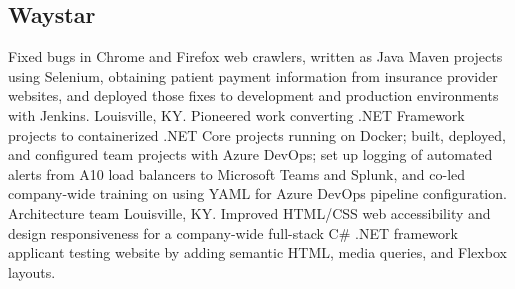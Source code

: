 \subsection{Waystar}
{Fixed bugs in Chrome and Firefox web crawlers, written as Java Maven projects using Selenium, obtaining patient payment information from insurance provider websites, and deployed those fixes to development and production environments with Jenkins.
}
{Louisville, KY. Pioneered work converting .NET Framework projects to containerized .NET Core projects running on Docker; built, deployed, and configured team projects with Azure DevOps; set up logging of automated alerts from A10 load balancers to Microsoft Teams and Splunk, and co-led company-wide training on using YAML for Azure DevOps pipeline configuration.
}
{Architecture team}
{}
{Louisville, KY. Improved HTML/CSS web accessibility and design responsiveness for a company-wide full-stack C\# .NET framework applicant testing website by adding semantic HTML, media queries, and Flexbox layouts. }
